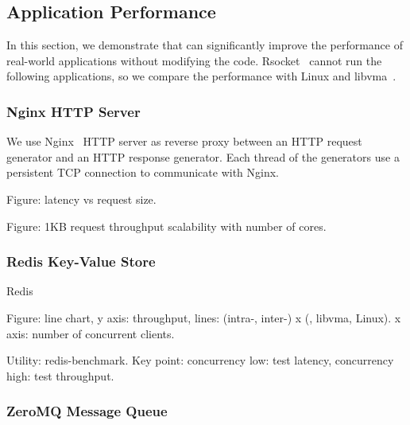 \subsection{Application Performance}
\label{subsec:application}

In this section, we demonstrate that \sys{} can significantly improve the performance of real-world applications without modifying the code.
Rsocket~\cite{rsockets} cannot run the following applications, so we compare the performance with Linux and libvma~\cite{libvma}.

\subsubsection{Nginx HTTP Server}
\quad

We use Nginx~\cite{nginx} HTTP server as reverse proxy between an HTTP request generator and an HTTP response generator.
Each thread of the generators use a persistent TCP connection to communicate with Nginx.

Figure: latency vs request size.

Figure: 1KB request throughput scalability with number of cores.

\subsubsection{Redis Key-Value Store}
\quad

Redis~\cite{redis}

Figure: line chart, y axis: throughput, lines: (intra-, inter-) x (\sys{}, libvma, Linux). x axis: number of concurrent clients.

Utility: redis-benchmark.
Key point: concurrency low: test latency, concurrency high: test throughput.





\subsubsection{ZeroMQ Message Queue}
\quad

